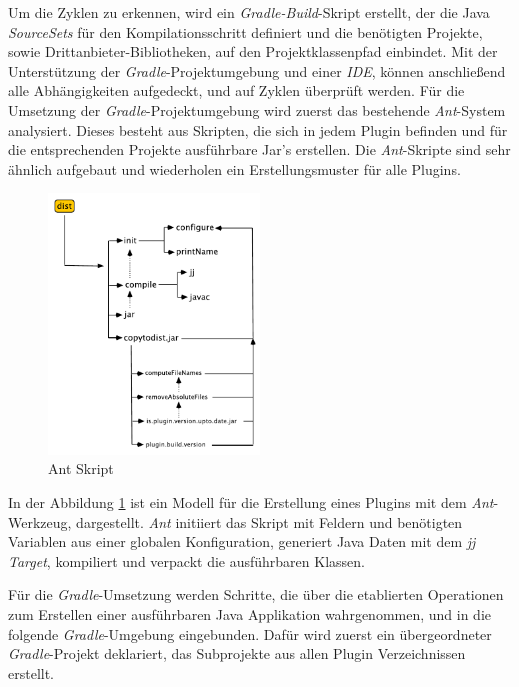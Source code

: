  	Um die Zyklen zu erkennen, wird ein \textit{Gradle-Build}-Skript erstellt, der die Java \textit{SourceSets} für den Kompilationsschritt definiert und die benötigten Projekte, sowie Drittanbieter-Bibliotheken, auf den Projektklassenpfad einbindet. Mit der Unterstützung der \textit{Gradle}-Projektumgebung und einer \textit{IDE}, können anschließend alle Abhängigkeiten aufgedeckt, und auf Zyklen überprüft werden. \newline
 	Für die Umsetzung der \textit{Gradle}-Projektumgebung wird zuerst das bestehende \textit{Ant}-System analysiert. Dieses besteht aus Skripten, die sich in jedem Plugin befinden und für die entsprechenden Projekte ausführbare Jar's erstellen. Die \textit{Ant}-Skripte sind sehr ähnlich aufgebaut und wiederholen ein Erstellungsmuster für alle Plugins. \newline
	\begin{figure}[h!]
	  \centering
	  \includegraphics[width=0.5\textwidth]{material/images/ant-build.pdf}
	  \caption{Ant Skript}
	  \label{fig:antscript}
	\end{figure}

	In der Abbildung \ref{fig:antscript} ist ein Modell für die Erstellung eines Plugins mit dem \textit{Ant}-Werkzeug, dargestellt. \textit{Ant} initiiert das Skript mit Feldern und benötigten Variablen aus einer globalen Konfiguration, generiert Java Daten mit dem \textit{jj Target}, kompiliert und verpackt die ausführbaren Klassen. \bigbreak
	
	Für die \textit{Gradle}-Umsetzung werden Schritte, die über die etablierten Operationen zum Erstellen einer ausführbaren Java Applikation wahrgenommen, und in die folgende \textit{Gradle}-Umgebung eingebunden.\newline
	Dafür wird zuerst ein übergeordneter \textit{Gradle}-Projekt deklariert, das Subprojekte aus allen Plugin Verzeichnissen erstellt.\bigbreak

